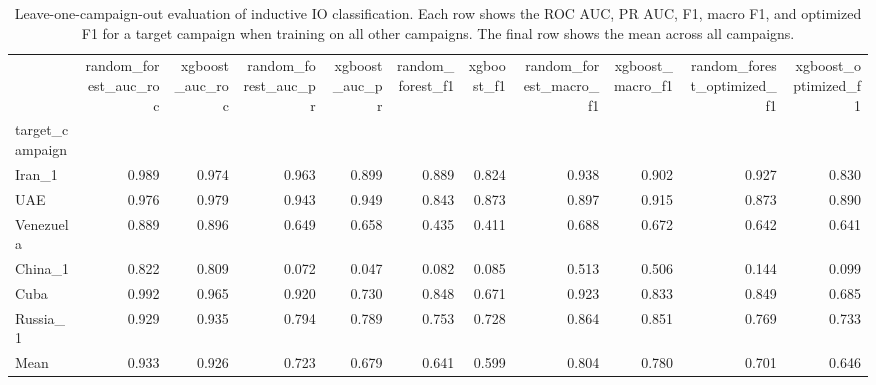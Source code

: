 \begin{table}
\caption{Leave-one-campaign-out evaluation of inductive IO classification. Each row shows the ROC AUC, PR AUC, F1, macro F1, and optimized F1 for a target campaign when training on all other campaigns. The final row shows the mean across all campaigns.}
\begin{tabular}{lrrrrrrrrrr}
\toprule
 & random_forest_auc_roc & xgboost_auc_roc & random_forest_auc_pr & xgboost_auc_pr & random_forest_f1 & xgboost_f1 & random_forest_macro_f1 & xgboost_macro_f1 & random_forest_optimized_f1 & xgboost_optimized_f1 \\
target_campaign &  &  &  &  &  &  &  &  &  &  \\
\midrule
Iran_1 & 0.989 & 0.974 & 0.963 & 0.899 & 0.889 & 0.824 & 0.938 & 0.902 & 0.927 & 0.830 \\
UAE & 0.976 & 0.979 & 0.943 & 0.949 & 0.843 & 0.873 & 0.897 & 0.915 & 0.873 & 0.890 \\
Venezuela & 0.889 & 0.896 & 0.649 & 0.658 & 0.435 & 0.411 & 0.688 & 0.672 & 0.642 & 0.641 \\
China_1 & 0.822 & 0.809 & 0.072 & 0.047 & 0.082 & 0.085 & 0.513 & 0.506 & 0.144 & 0.099 \\
Cuba & 0.992 & 0.965 & 0.920 & 0.730 & 0.848 & 0.671 & 0.923 & 0.833 & 0.849 & 0.685 \\
Russia_1 & 0.929 & 0.935 & 0.794 & 0.789 & 0.753 & 0.728 & 0.864 & 0.851 & 0.769 & 0.733 \\
Mean & 0.933 & 0.926 & 0.723 & 0.679 & 0.641 & 0.599 & 0.804 & 0.780 & 0.701 & 0.646 \\
\bottomrule
\end{tabular}
\end{table}
